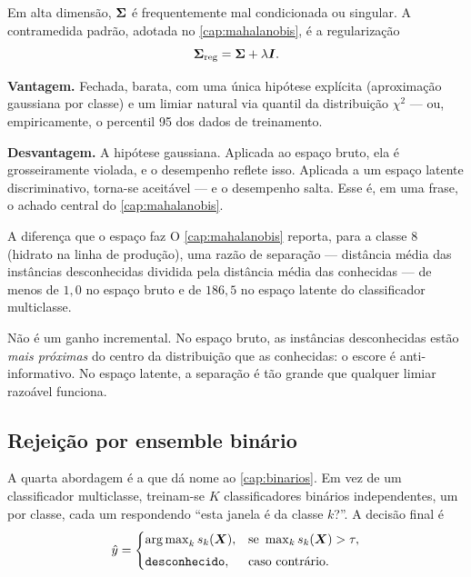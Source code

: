 Em alta dimensão, $\bm{\Sigma}$ é frequentemente mal condicionada ou singular. A
contramedida padrão, adotada no \cref{cap:mahalanobis}, é a regularização
\begin{equation}
  \bm{\Sigma}_{\text{reg}} = \bm{\Sigma} + \lambda \bm{I}.
  \label{eq:sigma-reg}
\end{equation}

\textbf{Vantagem.} Fechada, barata, com uma única hipótese explícita (aproximação
gaussiana por classe) e um limiar natural via quantil da distribuição
$\chi^2$ --- ou, empiricamente, o percentil 95 dos dados de treinamento.

\textbf{Desvantagem.} A hipótese gaussiana. Aplicada ao espaço bruto, ela é
grosseiramente violada, e o desempenho reflete isso. Aplicada a um espaço latente
discriminativo, torna-se aceitável --- e o desempenho salta. Esse é, em uma frase, o
achado central do \cref{cap:mahalanobis}.

\begin{exemplo}{A diferença que o espaço faz}
O \cref{cap:mahalanobis} reporta, para a classe 8 (hidrato na linha de produção), uma
razão de separação --- distância média das instâncias desconhecidas dividida pela
distância média das conhecidas --- de menos de $1{,}0$ no espaço bruto e de
$186{,}5$ no espaço latente do classificador multiclasse.

Não é um ganho incremental. No espaço bruto, as instâncias desconhecidas estão
\emph{mais próximas} do centro da distribuição que as conhecidas: o escore é
anti-informativo. No espaço latente, a separação é tão grande que qualquer limiar
razoável funciona.
\end{exemplo}

\subsection{Rejeição por ensemble binário}

A quarta abordagem é a que dá nome ao \cref{cap:binarios}. Em vez de um classificador
multiclasse, treinam-se $K$ classificadores binários independentes, um por classe, cada
um respondendo ``esta janela é da classe $k$?''. A decisão final é
\begin{equation}
  \hat{y} = \begin{cases}
    \operatorname*{arg\,max}_{k} s_k(\bm{X}), & \text{se } \max_k s_k(\bm{X}) > \tau, \\[0.3em]
    \texttt{desconhecido},    & \text{caso contrário.}
  \end{cases}
  \label{eq:ensemble-rejeicao}
\end{equation}

